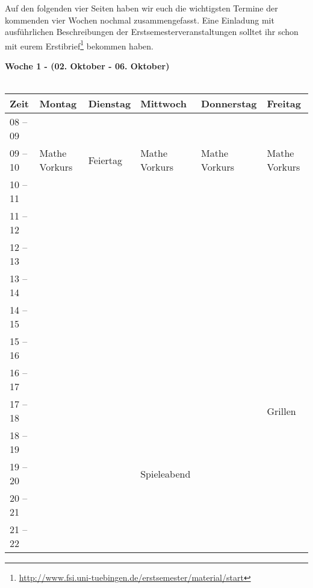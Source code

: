 Auf den folgenden vier Seiten haben wir euch die wichtigsten Termine der kommenden vier Wochen nochmal zusammengefasst. Eine Einladung mit ausführlichen Beschreibungen der Erstsemesterveranstaltungen solltet ihr schon mit eurem Erstibrief\footnote{\url{http://www.fsi.uni-tuebingen.de/erstsemester/material/start}} bekommen haben.
\vfill




\textbf{Woche 1 - (02. Oktober - 06. Oktober)}\\
\\
\begin{tabular}{|l|p{}|p{}|p{}|p{}|p{}|} \hline
 Zeit & Montag & Dienstag & Mittwoch & Donnerstag & Freitag \\ 
 \hline \hline
 08 -- 09 & & & & & \\ \cline{1-1} 
\cline{2-6}
 09 -- 10 &\footnotesize{Mathe Vorkurs} & \footnotesize{Feiertag} &\footnotesize{Mathe Vorkurs} & \footnotesize{Mathe Vorkurs} & \footnotesize{Mathe Vorkurs} \\ \cline{1-1}
 10 -- 11 & & & & & \\ \cline{1-1}
 11 -- 12 & & & & & \\ \cline{1-1}
 12 -- 13 & & & & & \\ \cline{1-1} 
 13 -- 14 & & & & & \\ \cline{1-1}
 14 -- 15 & & & & & \\ \cline{1-1}
 15 -- 16 & & & & & \\ \cline{1-2}\cline{4-6}
 16 -- 17 & & & & & \\ \cline{1-1}
 17 -- 18 & & & & &  \cellcolor{lightlightgray} \footnotesize{Grillen}\\ \cline{1-1} \cline{6-6}	
 18 -- 19 & & & & & \cellcolor{lightlightgray} \\ \cline{1-1}
 19 -- 20 & & &\cellcolor{lightlightgray} \footnotesize{Spieleabend} & & \cellcolor{lightlightgray}   \\ \cline{1-1}
 20 -- 21 & & &\cellcolor{lightlightgray} & &\cellcolor{lightlightgray}  \\ \cline{1-1}
 21 -- 22 & & &\cellcolor{lightlightgray} & & \cellcolor{lightlightgray}\\ \hline
 \end{tabular}
\vfil

